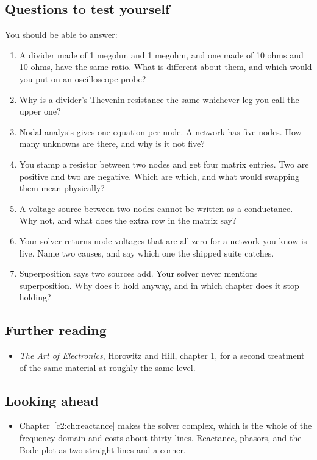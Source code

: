\subsection*{Questions to test yourself}
You should be able to answer:
\begin{enumerate}
  \item A divider made of 1 megohm and 1 megohm, and one made of 10 ohms and 10 ohms, have the same ratio. What is different about them, and which would you put on an oscilloscope probe?
  \item Why is a divider's Thevenin resistance the same whichever leg you call the upper one?
  \item Nodal analysis gives one equation per node. A network has five nodes. How many unknowns are there, and why is it not five?
  \item You stamp a resistor between two nodes and get four matrix entries. Two are positive and two are negative. Which are which, and what would swapping them mean physically?
  \item A voltage source between two nodes cannot be written as a conductance. Why not, and what does the extra row in the matrix say?
  \item Your solver returns node voltages that are all zero for a network you know is live. Name two causes, and say which one the shipped suite catches.
  \item Superposition says two sources add. Your solver never mentions superposition. Why does it hold anyway, and in which chapter does it stop holding?
\end{enumerate}

\subsection*{Further reading}
\begin{itemize}
  \item \emph{The Art of Electronics}, Horowitz and Hill, chapter 1, for a second treatment of the same material at roughly the same level.
\end{itemize}

\subsection*{Looking ahead}
\begin{itemize}
  \item Chapter~\ref{c2:ch:reactance} makes the solver complex, which is the whole of the frequency domain and costs about thirty lines. Reactance, phasors, and the Bode plot as two straight lines and a corner.
\end{itemize}
